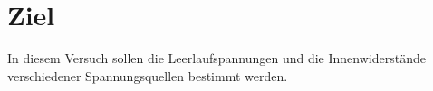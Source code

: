 \section{Ziel}
In diesem Versuch sollen die Leerlaufspannungen und die Innenwiderstände
verschiedener Spannungsquellen bestimmt werden. 
\label{sec:Ziel}
